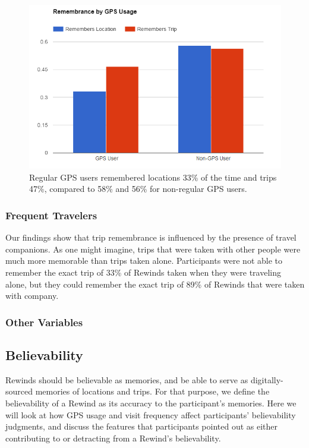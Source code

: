 \documentclass{sigchi}
\begin{document}
\begin{figure}
	\centering
	\includegraphics[width=1\linewidth]{GPS_remembrance_2}
	\caption{Regular GPS users remembered locations 33\% of the time and trips 47\%, compared to 58\% and 56\% for non-regular GPS users.}
	\label{fig:gpsmemory}
\end{figure}

\subsubsection{Frequent Travelers}
Our findings show that trip remembrance is influenced by the presence of travel companions. As one might imagine, trips that were taken with other people were much more memorable than trips taken alone. Participants were not able to remember the exact trip of 33\% of Rewinds taken when they were traveling alone, but they could remember the exact trip of 89\% of Rewinds that were taken with company.

\subsubsection{Other Variables}

\subsection{Believability}
Rewinds should be believable as memories, and be able to serve as digitally-sourced memories of locations and trips. For that purpose, we define the believability of a Rewind as its accuracy to the participant's memories. Here we will look at how GPS usage and visit frequency affect participants' believability judgments, and discuss the features that participants pointed out as either contributing to or detracting from a Rewind's believability.
\end{document}
